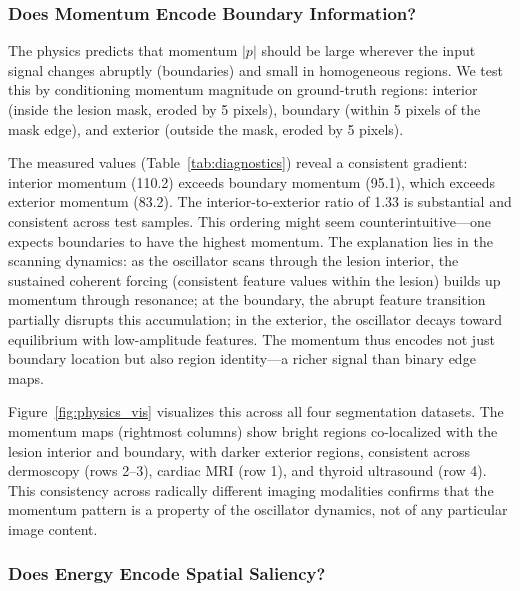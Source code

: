\documentclass[11pt]{article}
\begin{document}
\subsubsection{Does Momentum Encode Boundary Information?}

The physics predicts that momentum $|p|$ should be large wherever the input signal changes abruptly (boundaries) and small in homogeneous regions. We test this by conditioning momentum magnitude on ground-truth regions: interior (inside the lesion mask, eroded by 5 pixels), boundary (within 5 pixels of the mask edge), and exterior (outside the mask, eroded by 5 pixels).

The measured values (Table~\ref{tab:diagnostics}) reveal a consistent gradient: interior momentum (110.2) exceeds boundary momentum (95.1), which exceeds exterior momentum (83.2). The interior-to-exterior ratio of 1.33 is substantial and consistent across test samples. This ordering might seem counterintuitive---one expects boundaries to have the highest momentum. The explanation lies in the scanning dynamics: as the oscillator scans through the lesion interior, the sustained coherent forcing (consistent feature values within the lesion) builds up momentum through resonance; at the boundary, the abrupt feature transition partially disrupts this accumulation; in the exterior, the oscillator decays toward equilibrium with low-amplitude features. The momentum thus encodes not just boundary location but also region identity---a richer signal than binary edge maps.

Figure~\ref{fig:physics_vis} visualizes this across all four segmentation datasets. The momentum maps (rightmost columns) show bright regions co-localized with the lesion interior and boundary, with darker exterior regions, consistent across dermoscopy (rows 2--3), cardiac MRI (row 1), and thyroid ultrasound (row 4). This consistency across radically different imaging modalities confirms that the momentum pattern is a property of the oscillator dynamics, not of any particular image content.


\subsubsection{Does Energy Encode Spatial Saliency?}
\end{document}
